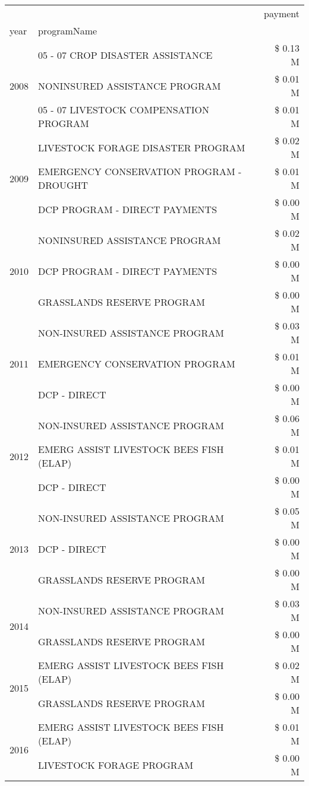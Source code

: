 \begin{tabular}{llr}
\toprule
 &  & payment \\
year & programName &  \\
\midrule
\multirow[t]{3}{*}{2008} & 05 - 07 CROP DISASTER ASSISTANCE & \$ 0.13 M \\
 & NONINSURED ASSISTANCE PROGRAM & \$ 0.01 M \\
 & 05 - 07 LIVESTOCK COMPENSATION PROGRAM & \$ 0.01 M \\
\cline{1-3}
\multirow[t]{3}{*}{2009} & LIVESTOCK FORAGE DISASTER  PROGRAM & \$ 0.02 M \\
 & EMERGENCY CONSERVATION PROGRAM - DROUGHT & \$ 0.01 M \\
 & DCP PROGRAM - DIRECT PAYMENTS & \$ 0.00 M \\
\cline{1-3}
\multirow[t]{3}{*}{2010} & NONINSURED ASSISTANCE PROGRAM & \$ 0.02 M \\
 & DCP PROGRAM - DIRECT PAYMENTS & \$ 0.00 M \\
 & GRASSLANDS RESERVE PROGRAM & \$ 0.00 M \\
\cline{1-3}
\multirow[t]{3}{*}{2011} & NON-INSURED ASSISTANCE PROGRAM & \$ 0.03 M \\
 & EMERGENCY CONSERVATION PROGRAM & \$ 0.01 M \\
 & DCP - DIRECT & \$ 0.00 M \\
\cline{1-3}
\multirow[t]{3}{*}{2012} & NON-INSURED ASSISTANCE PROGRAM & \$ 0.06 M \\
 & EMERG ASSIST LIVESTOCK BEES FISH (ELAP) & \$ 0.01 M \\
 & DCP - DIRECT & \$ 0.00 M \\
\cline{1-3}
\multirow[t]{3}{*}{2013} & NON-INSURED ASSISTANCE PROGRAM & \$ 0.05 M \\
 & DCP - DIRECT & \$ 0.00 M \\
 & GRASSLANDS RESERVE PROGRAM & \$ 0.00 M \\
\cline{1-3}
\multirow[t]{2}{*}{2014} & NON-INSURED ASSISTANCE PROGRAM & \$ 0.03 M \\
 & GRASSLANDS RESERVE PROGRAM & \$ 0.00 M \\
\cline{1-3}
\multirow[t]{2}{*}{2015} & EMERG ASSIST LIVESTOCK BEES FISH (ELAP) & \$ 0.02 M \\
 & GRASSLANDS RESERVE PROGRAM & \$ 0.00 M \\
\cline{1-3}
\multirow[t]{2}{*}{2016} & EMERG ASSIST LIVESTOCK BEES FISH (ELAP)       & \$ 0.01 M \\
 & LIVESTOCK FORAGE PROGRAM                      & \$ 0.00 M \\

\end{tabular}

